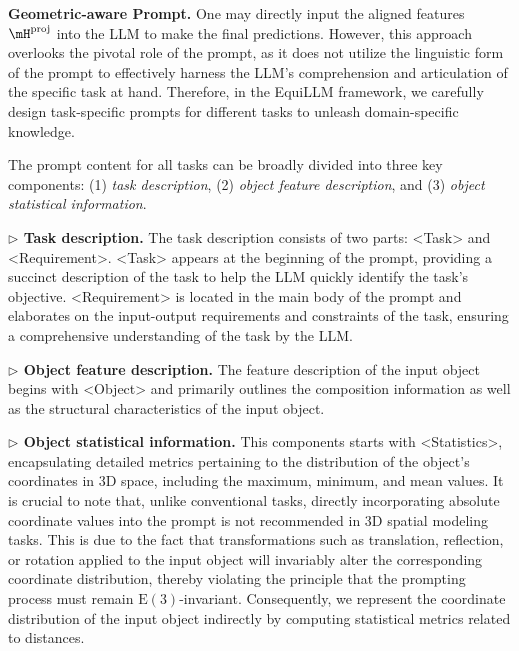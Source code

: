 \textbf{Geometric-aware Prompt.} One may directly input the aligned features $\mH^{\text{proj}}$ into the LLM to make the final predictions. However, this approach overlooks the pivotal role of the prompt, as it does not utilize the linguistic form of the prompt to effectively harness the LLM's comprehension and articulation of the specific task at hand. Therefore, in the EquiLLM framework, we carefully design task-specific prompts for different tasks to unleash domain-specific knowledge. 

The prompt content for all tasks can be broadly divided into three key components: (1) \emph{task description}, (2) \emph{object feature description}, and (3) \emph{object statistical information}.

\textbf{$\triangleright$ Task description.} The task description consists of two parts: <Task> and <Requirement>. <Task> appears at the beginning of the prompt, providing a succinct description of the task to help the LLM quickly identify the task's objective. <Requirement> is located in the main body of the prompt and elaborates on the input-output requirements and constraints of the task, ensuring a comprehensive understanding of the task by the LLM. 

\textbf{$\triangleright$ Object feature description.} The feature description of the input object begins with <Object> and primarily outlines the composition information as well as the structural characteristics of the input object. 

\textbf{$\triangleright$ Object statistical information.} This components starts with <Statistics>, encapsulating detailed metrics pertaining to the distribution of the object's coordinates in 3D space, including the maximum, minimum, and mean values. It is crucial to note that, unlike conventional tasks, directly incorporating absolute coordinate values into the prompt is not recommended in 3D spatial modeling tasks. This is due to the fact that transformations such as translation, reflection, or rotation applied to the input object will invariably alter the corresponding coordinate distribution, thereby violating the principle that the prompting process must remain $\mathrm{E}(3)$-invariant. Consequently, we represent the coordinate distribution of the input object indirectly by computing statistical metrics related to distances. 


